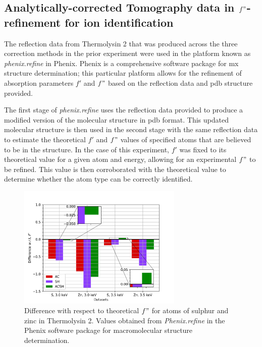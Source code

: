\subsection{Analytically-corrected Tomography data in $f"$-refinement for ion identification}


The reflection data from Thermolysin 2 that was produced across the three correction methods in the prior experiment were used in the platform known as \textit{phenix.refine} in Phenix. Phenix is a comprehensive software package for \ac{mx} structure determination; this particular platform allows for the refinement of absorption parameters $f'$ and $f"$ based on the reflection data and \ac{pdb} structure provided.

The first stage of \textit{phenix.refine} uses the reflection data provided to produce a modified version of the molecular structure in \ac{pdb} format. This updated molecular structure is then used in the second stage with the same reflection data to estimate the theoretical $f'$ and $f"$ values of specified atoms that are believed to be in the structure. In the case of this experiment, $f'$ was fixed to its theoretical value for a given atom and energy, allowing for an experimental $f"$ to be refined. This value is then corroborated with the theoretical value to determine whether the atom type can be correctly identified.%


\begin{figure}[h]
    \centering
    \includegraphics[width = 0.7\textwidth]{plots/phenix_plot_Pat.png}
    \caption{Difference with respect to theoretical $f"$ for atoms of sulphur and zinc in Thermolysin 2. Values obtained from \textit{Phenix.refine} in the Phenix software package for macromolecular structure determination.}
    \label{fig:phenix_plot}
\end{figure}

